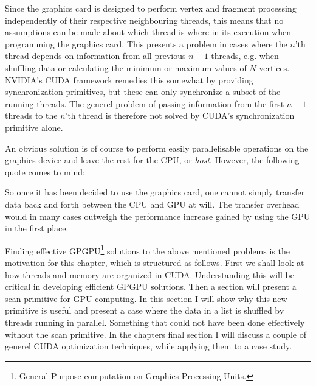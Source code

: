 Since the graphics card is designed to perform vertex and fragment processing
independently of their respective neighbouring threads, this means that no
assumptions can be made about which thread is where in its execution when
programming the graphics card. This presents a problem in cases where the $n$'th
thread depends on information from all previous $n-1$ threads, e.g. when
shuffling data or calculating the minimum or maximum values of $N$
vertices. NVIDIA's CUDA framework remedies this somewhat by providing
synchronization primitives, but these can only synchronize a subset of the
running threads. The generel problem of passing information from the first $n-1$
threads to the $n$'th thread is therefore not solved by CUDA's synchronization
primitive alone.


An obvious solution is of course to perform easily parallelisable operations on
the graphics device and leave the rest for the CPU, or \textit{host}. However,
the following quote comes to mind:


So once it has been decided to use the graphics card, one cannot simply transfer
data back and forth between the CPU and GPU at will. The transfer overhead would
in many cases outweigh the performance increase gained by using the GPU in the
first place.




Finding effective GPGPU\footnote{General-Purpose computation on Graphics
  Processing Units.} solutions to the above mentioned problems is the motivation
for this chapter, which is structured as follows. First we shall look at how
threads and memory are organized in CUDA. Understanding this will be critical in
developing efficient GPGPU solutions. Then a section will present a scan
primitive for GPU computing. In this section I will show why this new primitive
is useful and present a case where the data in a list is shuffled by threads
running in parallel. Something that could not have been done effectively without
the scan primitive. In the chapters final section I will discuss a couple of
generel CUDA optimization techniques, while applying them to a case study.

